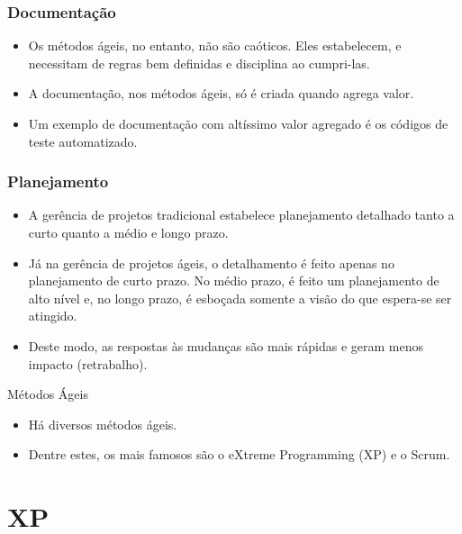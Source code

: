 \documentclass[11pt]{beamer}
\begin{document}
    \begin{frame}
      \frametitle{Documentação}
      \begin{itemize}
         \item Os métodos ágeis, no entanto, não são caóticos. Eles estabelecem, e necessitam de regras bem definidas e disciplina ao cumpri-las.
         \item A documentação, nos métodos ágeis, só é criada quando agrega valor.
         \item Um exemplo de documentação com altíssimo valor agregado é os códigos de teste automatizado. 
      \end{itemize}
    \end{frame}

    \begin{frame}
      \frametitle{Planejamento}
      \begin{itemize}
         \item A gerência de projetos tradicional estabelece planejamento detalhado tanto a curto quanto a médio e longo prazo.
         \item Já na gerência de projetos ágeis, o detalhamento é feito apenas no planejamento de curto prazo. No médio prazo, é feito um planejamento de alto nível e, no longo prazo, é esboçada somente a visão do que espera-se ser atingido.
         \item Deste modo, as respostas às mudanças são mais rápidas e geram menos impacto (retrabalho). 
      \end{itemize}
    \end{frame}

    \begin{frame}{Métodos Ágeis}
      \begin{itemize}
         \item Há diversos métodos ágeis.
         \item Dentre estes, os mais famosos são o eXtreme Programming (XP) e o Scrum.
      \end{itemize}
    \end{frame}
    
    \section{XP}
\end{document}

